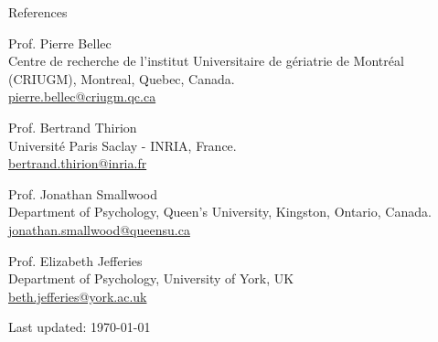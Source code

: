 \documentclass{resume} %
\begin{document}
\begin{rSection}{References}


	Prof. Pierre Bellec\\
	Centre de recherche de l'institut Universitaire de gériatrie de Montréal (CRIUGM), Montreal, Quebec, Canada.\\
 	\href{pierre.bellec@criugm.qc.ca}{pierre.bellec@criugm.qc.ca}
 	
	Prof. Bertrand Thirion\\
	Université Paris Saclay - INRIA, France. \\
 	\href{bertrand.thirion@inria.fr}{bertrand.thirion@inria.fr}
 	
 	Prof. Jonathan Smallwood\\
 	Department of Psychology, Queen's University, Kingston, Ontario, Canada.\\
 	\href{jonathan.smallwood@queensu.ca}{jonathan.smallwood@queensu.ca}

 	Prof. Elizabeth Jefferies\\
 	Department of Psychology, University of York, UK\\
 	\href{beth.jefferies@york.ac.uk}{beth.jefferies@york.ac.uk}

	

\end{rSection}

\sectionskip
\centering
Last updated: \today
\end{document}
